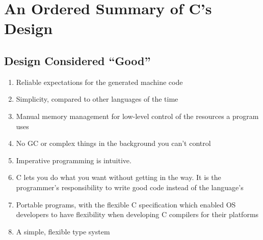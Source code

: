 \documentclass{article}
\begin{document}
    
    
    

\section{An Ordered Summary of C's Design}
\subsection*{Design Considered ``Good''}
    \begin{enumerate}
        \item Reliable expectations for the generated machine code
        \item Simplicity, compared to other languages of the time
        \item Manual memory management for low-level control of the resources a program uses
        \item No GC or complex things in the background you can't control
        \item Imperative programming is intuitive.
        \item C lets you do what you want without getting in the way. It is the programmer's responsibility to write good code instead of the language's 
        \item Portable programs, with the flexible C specification which enabled OS developers to have flexibility when developing C compilers for their platforms
        \item A simple, flexible type system
    \end{enumerate}
\end{document}
